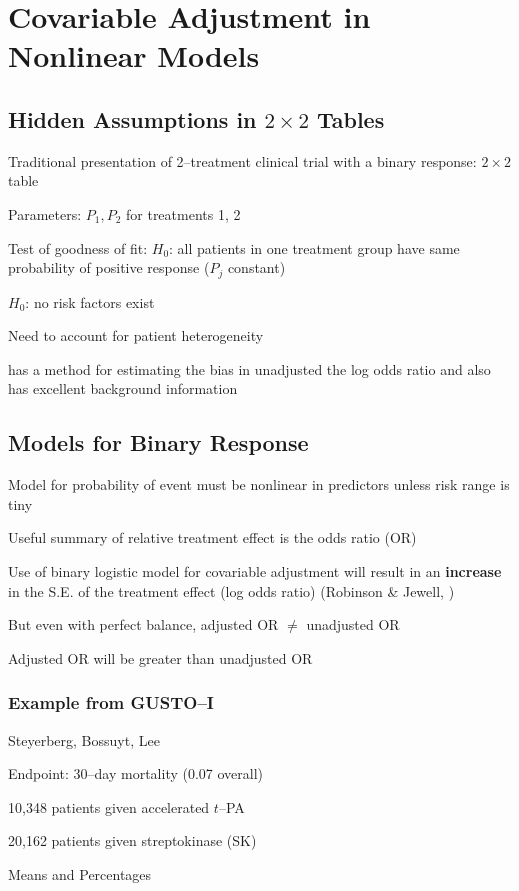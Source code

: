 \section{Covariable Adjustment in Nonlinear Models}
\subsection{Hidden Assumptions in $2 \times 2$ Tables}
\bi
\item   Traditional presentation of 2--treatment clinical trial with a
        binary response: $2 \times 2$ table
\item   Parameters: $P_{1}, P_{2}$ for treatments 1, 2
\item   Test of goodness of fit: $H_0$: all patients in one treatment
        group have same probability of positive response ($P_j$ constant)
\item   \ra $H_0$: no risk factors exist
\item   Need to account for patient heterogeneity
\item   \cite{mat15inc} has a method for estimating the bias in
  unadjusted the log odds ratio and also has excellent background information
\ei

\subsection{Models for Binary Response}
\bi
\item   Model for probability of event must be nonlinear in predictors
        unless risk range is tiny
\item   Useful summary of relative treatment effect is the odds ratio (OR)
\item   Use of binary logistic model for covariable adjustment will
        result in an {\bf increase} in the S.E. of the treatment
        effect (log odds ratio) (Robinson \& Jewell, \cite{rob91som})
\item   But even with perfect balance, adjusted OR $\neq$ unadjusted
        OR
\item   Adjusted OR will be greater than unadjusted OR
\ei

\subsubsection{Example from GUSTO--I}\label{sec:ancova-gusto}
\bi
\item   Steyerberg, Bossuyt, Lee \cite{ste00cli}
\item   Endpoint: 30--day mortality (0.07 overall)
\item   10,348 patients given accelerated $t$--PA
\item   20,162 patients given streptokinase (SK)
\item   Means and Percentages
\ei

